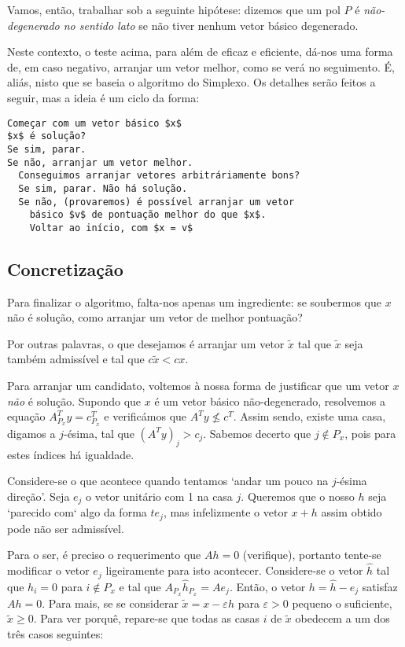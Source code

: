 \documentclass{article}
\theoremstyle{definition}
\begin{document}
	Vamos, então, trabalhar sob a seguinte hipótese: dizemos que um pol $P$ é \emph{não-degenerado no sentido lato} se não tiver nenhum vetor básico degenerado.
	
	Neste contexto, o teste acima, para além de eficaz e eficiente, dá-nos uma forma de, em caso negativo, arranjar um vetor melhor, como se verá no seguimento. É, aliás, nisto que se baseia o algoritmo do Simplexo. Os detalhes serão feitos a seguir, mas a ideia é um ciclo da forma:
	
	\begin{lstlisting}[mathescape=true, keepspaces=true]
Começar com um vetor básico $x$
$x$ é solução?
Se sim, parar.
Se não, arranjar um vetor melhor.
  Conseguimos arranjar vetores arbitráriamente bons?
  Se sim, parar. Não há solução.
  Se não, (provaremos) é possível arranjar um vetor
    básico $v$ de pontuação melhor do que $x$.
    Voltar ao início, com $x = v$
	\end{lstlisting}
	
	\subsection{Concretização}
	
	Para finalizar o algoritmo, falta-nos apenas um ingrediente: se soubermos que $x$ não é solução, como arranjar um vetor de melhor pontuação?
	
	Por outras palavras, o que desejamos é arranjar um vetor $\tilde x$ tal que $\tilde x$ seja também admissível e tal que $c \tilde x < cx$.
	
	Para arranjar um candidato, voltemos à nossa forma de justificar que um vetor $x$ \emph{não} é solução. Supondo que $x$ é um vetor básico não-degenerado, resolvemos a equação $A_{P_x}^T y = c^T_{P_x}$ e verificámos que ${A^T y \not\leq c^T}$. Assim sendo, existe uma casa, digamos a $j$-ésima, tal que ${(A^T y)_j > c_j}$. Sabemos decerto que $j \not \in P_x$, pois para estes índices há igualdade.
	
	Considere-se o que acontece quando tentamos `andar um pouco na $j$-ésima direção'. Seja $e_j$ o vetor unitário com 1 na casa $j$. Queremos que o nosso $h$ seja `parecido com` algo da forma $t e_j$, mas infelizmente o vetor $x + h$ assim obtido pode não ser admissível.
	
	Para o ser, é preciso o requerimento que $Ah = 0$ (verifique), portanto tente-se modificar o vetor $e_j$ ligeiramente para isto acontecer. Considere-se o vetor $\hat h$ tal que $h_i = 0$ para $i \not \in P_x$ e tal que $A_{P_x} \hat h_{P_x} = A e_j$. Então, o vetor $h = \hat h - e_j$ satisfaz $A h = 0$. Para mais, se se considerar $\tilde x = x - \varepsilon h$ para $\varepsilon > 0$ pequeno o suficiente, $\tilde x \geq 0$. Para ver porquê, repare-se que todas as casas $i$ de $\tilde x$ obedecem a um dos três casos seguintes:
	
\end{document}
